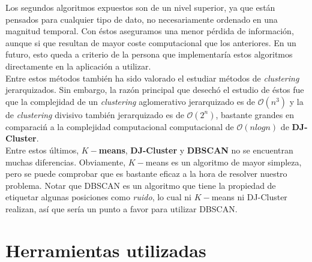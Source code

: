 \documentclass[a4paper, 12pt]{article}
\begin{document}
Los segundos algoritmos expuestos son de un nivel superior, ya que est\'an pensados para cualquier tipo de dato, no necesariamente ordenado en una magnitud temporal. Con \'estos aseguramos una menor p\'erdida de informaci\'on, aunque si que resultan de mayor coste computacional que los anteriores. En un futuro, esto queda a criterio de la persona que implementar\'ia estos algoritmos directamente en la aplicaci\'on a utilizar. \\

Entre estos m\'etodos tambi\'en ha sido valorado el estudiar m\'etodos de \textit{clustering} jerarquizados. Sin embargo, la raz\'on principal que desech\'o el estudio de \'estos fue que la complejidad de un \textit{clustering} aglomerativo jerarquizado es de $\mathcal{O}(n^3)$ y la de \textit{clustering} divisivo tambi\'en jerarquizado es de $\mathcal{O}(2^n)$, bastante grandes en comparaci\'n a la complejidad computacional computacional de $\mathcal{O}(n log n)$ de \textbf{DJ-Cluster}.\\

Entre estos \'ultimos, \textbf{$K-$means}, \textbf{DJ-Cluster} y \textbf{DBSCAN} no se encuentran muchas diferencias. Obviamente, $K-$means es un algoritmo de mayor simpleza, pero se puede comprobar que es bastante eficaz a la hora de resolver nuestro problema. Notar que DBSCAN es un algoritmo que tiene la propiedad de etiquetar algunas posiciones como \textit{ruido}, lo cual ni $K-$means ni DJ-Cluster realizan, as\'i que ser\'ia un punto a favor para utilizar DBSCAN.


\pagebreak
\section{Herramientas utilizadas}
\end{document}
